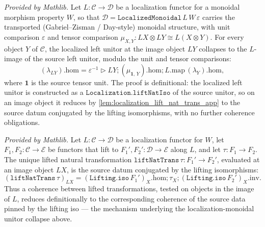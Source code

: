 \begin{lemma}
  \label{lem:localization_monoidal_left_unitor_hom_app}
  \mathlibok
  \textit{Provided by Mathlib.}
  Let \(L : \mathcal{C} \to \mathcal{D}\) be a localization functor for a monoidal morphism property
  \(W\), so that \(\mathcal{D} = \mathtt{LocalizedMonoidal}\,L\,W\,\varepsilon\) carries the transported
  (Gabriel--Zisman / Day-style) monoidal structure, with unit comparison \(\varepsilon\) and tensor
  comparison \(\mu_{X,Y} : L X \otimes L Y \cong L(X \otimes Y)\). For every object \(Y\) of
  \(\mathcal{C}\), the localized left unitor at the image object \(L Y\) collapses to the \(L\)-image of
  the source left unitor, modulo the unit and tensor comparisons:
  \[
    (\lambda_{L Y}).\mathrm{hom}
      = \varepsilon^{-1} \rhd L Y
        \mathbin{;} (\mu_{\mathbf 1,\,Y}).\mathrm{hom}
        \mathbin{;} L.\mathrm{map}\,(\lambda_Y).\mathrm{hom},
  \]
  where \(\mathbf 1\) is the source tensor unit. The proof is definitional: the localized left unitor
  is constructed as a \(\mathtt{Localization.liftNatIso}\) of the source unitor, so on an image object it
  reduces by \cref{lem:localization_lift_nat_trans_app} to the source datum conjugated by the lifting
  isomorphisms, with no further coherence obligations.
\end{lemma}

\begin{lemma}
  \label{lem:localization_lift_nat_trans_app}
  \mathlibok
  \textit{Provided by Mathlib.}
  Let \(L : \mathcal{C} \to \mathcal{D}\) be a localization functor for \(W\), let \(F_1, F_2 :
  \mathcal{C} \to \mathcal{E}\) be functors that lift to \(F_1', F_2' : \mathcal{D} \to \mathcal{E}\)
  along \(L\), and let \(\tau : F_1 \to F_2\). The unique lifted natural transformation
  \(\mathtt{liftNatTrans}\,\tau : F_1' \to F_2'\), evaluated at an image object \(L X\), is the source
  datum conjugated by the lifting isomorphisms:
  \[
    (\mathtt{liftNatTrans}\,\tau)_{L X}
      = (\mathtt{Lifting.iso}\,F_1')_{X}.\mathrm{hom}
        \mathbin{;} \tau_X
        \mathbin{;} (\mathtt{Lifting.iso}\,F_2')_{X}.\mathrm{inv}.
  \]
  Thus a coherence between lifted transformations, tested on objects in the image of \(L\), reduces
  definitionally to the corresponding coherence of the source data pinned by the lifting iso --- the
  mechanism underlying the localization-monoidal unitor collapse above.
\end{lemma}


